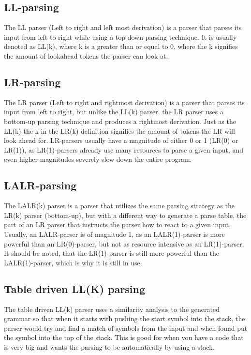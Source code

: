 \subsection*{LL-parsing}
The LL parser (Left to right and left most derivation) is a parser that parses its input from left to right while using a top-down parsing technique. It is usually denoted as LL(k), where k is a greater than or equal to 0, where the k signifies the amount of lookahead tokens the parser can look at\cite{conceptsOfProgrammingLanguages}.


\subsection*{LR-parsing}
The LR parser (Left to right and rightmost derivation) is a parser that parses its input from left to right, but unlike the LL(k) parser, the LR parser uses a bottom-up parsing technique and produces a rightmost derivation. Just as the LL(k) the k in the LR(k)-definition signifies the amount of tokens the LR will look ahead for\cite{conceptsOfProgrammingLanguages}. LR-parsers usually have a magnitude of either 0 or 1 (LR(0) or LR(1)), as LR(1)-parsers already use many resources to parse a given input, and even higher magnitudes severely slow down the entire program.


\subsection*{LALR-parsing}
The LALR(k) parser is a parser that utilizes the same parsing strategy as the LR(k) parser (bottom-up), but with a different way to generate a parse table, the part of an LR parser that instructs the parser how to react to a given input. Usually, an LALR-parser is of magnitude 1, as an LALR(1)-parser is more powerful than an LR(0)-parser, but not as resource intensive as an LR(1)-parser. It should be noted, that the LR(1)-parser is still more powerful than the LALR(1)-parser, which is why it is still in use\cite{crafting-a-compiler}.


\subsection*{Table driven LL(K) parsing}
The table driven LL(k) parser uses a similarity analysis to the generated grammar so that when it starts with pushing the start symbol into the stack, the parser would try and find a match of symbols from the input and when found put the symbol into the top of the stack\cite{crafting-a-compiler}. This is good for when you have a code that is very big and wants the parsing to be automatically by using a stack.
\\

